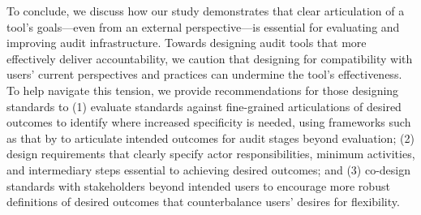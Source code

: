 To conclude, we discuss how our study demonstrates that clear articulation of a tool’s goals---even from an external perspective---is essential for evaluating and improving audit infrastructure. Towards designing audit tools that more effectively deliver accountability, we caution that designing for compatibility with users' current perspectives and practices can undermine the tool's effectiveness. To help navigate this tension, we provide recommendations for those designing standards to (1) evaluate standards against fine-grained articulations of desired outcomes to identify where increased specificity is needed, using frameworks such as that by \citet{ojewale2025towards} to articulate intended outcomes for audit stages beyond evaluation; (2) design requirements that clearly specify actor responsibilities, minimum activities, and intermediary steps essential to achieving desired outcomes; and (3) co-design standards with stakeholders beyond intended users to encourage more robust definitions of desired outcomes that counterbalance users' desires for flexibility. 



